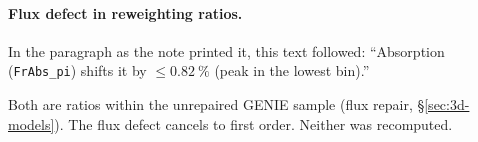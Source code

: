 \paragraph{Flux defect in reweighting ratios.} In the paragraph as the note printed it, this text followed: ``Absorption (\texttt{FrAbs\_pi}) shifts it by $\le\SI{0.82}{\percent}$ (peak in the lowest bin).''\par Both are ratios within the unrepaired GENIE sample (flux repair, \S\ref{sec:3d-models}). The flux defect cancels to first order. Neither was recomputed.

